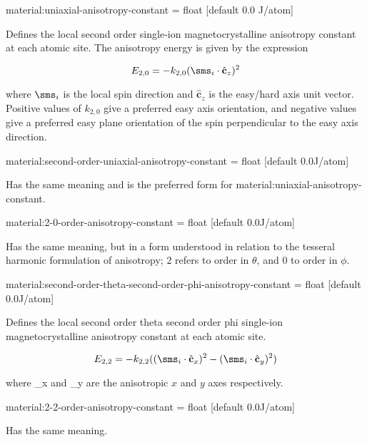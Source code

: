 {\zicf material:uniaxial-anisotropy-constant = float [default 0.0 J/atom]} Defines the local second order single-ion magnetocrystalline anisotropy constant at each atomic site. The anisotropy energy is given by the expression

\begin{equation*}
E_{2,0} = -k_{2,0} (\sms_i \cdot \hat{\mathbf{c}}_z )^2
\end{equation*}

\noindent where $\sms_i$ is the local spin direction and $\hat{\mathbf{c}}_z$ is the easy/hard axis unit vector. Positive values of $k_{2,0}$ give a preferred easy axis orientation, and negative values give a preferred easy plane orientation of the spin perpendicular to the easy axis direction.

{\zicf material:second-order-uniaxial-anisotropy-constant = float [default 0.0\newline J/atom]} Has the same meaning and is the preferred form for material:uniaxial-anisotropy-constant.

{\zicf material:2-0-order-anisotropy-constant = float [default 0.0\newline J/atom]} Has the same meaning, but in a form understood in relation to the tesseral harmonic formulation of anisotropy; 2 refers to order in $\theta$, and 0 to order in $\phi$.

{\zicf material:second-order-theta-second-order-phi-anisotropy-constant = float [default 0.0\newline J/atom]} Defines the local second order theta second order phi single-ion magnetocrystalline anisotropy constant at each atomic site.

\begin{equation*}
E_{2,2} = - k_{2,2} ( ( \sms_i \cdot \hat{\mathbf{c}}_x )^2 - ( \sms_i \cdot \hat{\mathbf{c}}_y )^2 )
\end{equation*}

\noindent where _x and _y are the anisotropic $x$ and $y$ axes respectively.

{\zicf material:2-2-order-anisotropy-constant = float [default 0.0\newline J/atom]} Has the same meaning.

